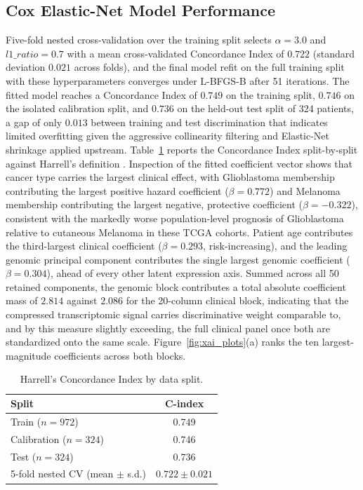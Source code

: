 \documentclass[10pt,a4paper]{article}
\begin{document}
\subsection{Cox Elastic-Net Model Performance}
Five-fold nested cross-validation over the training split selects $\alpha = 3.0$ and $l1\_ratio = 0.7$ with a mean cross-validated Concordance Index of $0.722$ (standard deviation $0.021$ across folds), and the final model refit on the full training split with these hyperparameters converges under L-BFGS-B after 51 iterations. The fitted model reaches a Concordance Index of $0.749$ on the training split, $0.746$ on the isolated calibration split, and $0.736$ on the held-out test split of 324 patients, a gap of only $0.013$ between training and test discrimination that indicates limited overfitting given the aggressive collinearity filtering and Elastic-Net shrinkage applied upstream. Table~\ref{tab:cindex} reports the Concordance Index split-by-split against Harrell's definition \cite{harrell1982evaluating}. Inspection of the fitted coefficient vector shows that cancer type carries the largest clinical effect, with Glioblastoma membership contributing the largest positive hazard coefficient ($\beta = 0.772$) and Melanoma membership contributing the largest negative, protective coefficient ($\beta = -0.322$), consistent with the markedly worse population-level prognosis of Glioblastoma relative to cutaneous Melanoma in these TCGA cohorts. Patient age contributes the third-largest clinical coefficient ($\beta = 0.293$, risk-increasing), and the leading genomic principal component contributes the single largest genomic coefficient ($\beta = 0.304$), ahead of every other latent expression axis. Summed across all 50 retained components, the genomic block contributes a total absolute coefficient mass of $2.814$ against $2.086$ for the 20-column clinical block, indicating that the compressed transcriptomic signal carries discriminative weight comparable to, and by this measure slightly exceeding, the full clinical panel once both are standardized onto the same scale. Figure~\ref{fig:xai_plots}(a) ranks the ten largest-magnitude coefficients across both blocks.

\begin{table}[!htbp]
\centering
\caption{Harrell's Concordance Index by data split.}
  \label{tab:cindex}
  \begin{tabular}{lc}
    \toprule
    Split & C-index \\
    \midrule
    Train ($n=972$) & 0.749 \\
    Calibration ($n=324$) & 0.746 \\
    Test ($n=324$) & 0.736 \\
    5-fold nested CV (mean $\pm$ s.d.) & $0.722 \pm 0.021$ \\
  \bottomrule
\end{tabular}
\end{table}
\end{document}
